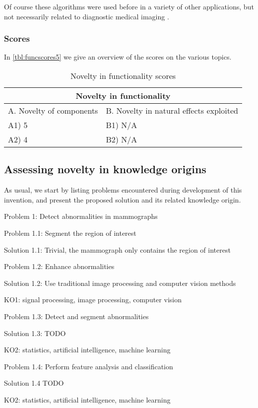 Of course these algorithms were used before in a variety of other applications,
but not necessarily related to diagnostic medical imaging
\cite{machinelearningapps}. 

\subsubsection{Scores}
In \autoref{tbl:funcscores5} we give an overview of the scores on the various
topics.

\begin{table}[h]
\centering
\begin{tabular}{l l}
\hline
\multicolumn{2}{|c|}{Novelty in functionality} \\
\hline
A. Novelty of components & B. Novelty in natural effects exploited\\
A1) 5 & B1) N/A\\ 
A2) 4 & B2) N/A\\ 
\hline
\end{tabular}
\caption{Novelty in functionality scores}
\label{tbl:funcscores5}
\end{table}

\subsection{Assessing novelty in knowledge origins}
As usual, we start by listing problems encountered during development of this
invention, and present the proposed solution and its related knowledge origin.

Problem 1: Detect abnormalities in mammographs

Problem 1.1: Segment the region of interest

Solution 1.1: Trivial, the mammograph only contains the region of interest

Problem 1.2: Enhance abnormalities

Solution 1.2: Use traditional image processing and computer vision methods

KO1: signal processing, image processing, computer vision 

Problem 1.3: Detect and segment abnormalities

Solution 1.3: TODO

KO2: statistics, artificial intelligence, machine learning

Problem 1.4: Perform feature analysis and classification

Solution 1.4 TODO

KO2: statistics, artificial intelligence, machine learning

